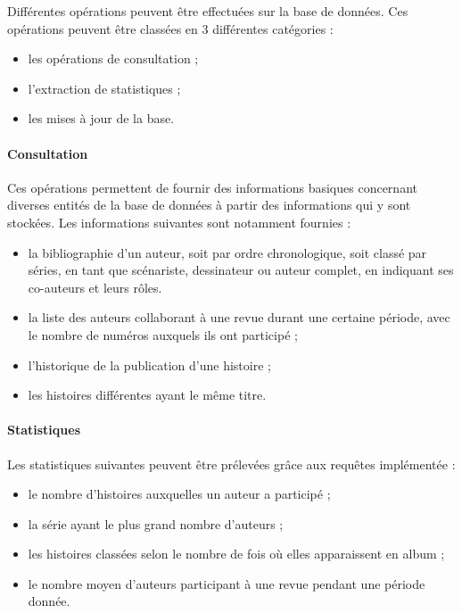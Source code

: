 \documentclass[12pt]{article}
\begin{document}
Différentes opérations peuvent être effectuées sur la base de données.
Ces opérations peuvent être classées en 3 différentes catégories :
\begin{itemize}
	\item les opérations de consultation ;
	\item l'extraction de statistiques ;
	\item les mises à jour de la base.
\end{itemize}

\paragraph{Consultation}
Ces opérations permettent de fournir des informations basiques concernant
diverses entités de la base de données à partir des informations qui y sont
stockées.
Les informations suivantes sont notamment fournies :
\begin{itemize}
	\item la bibliographie d’un auteur, soit par ordre chronologique, soit classé par séries, en tant que
		scénariste, dessinateur ou auteur complet, en indiquant ses co-auteurs et leurs rôles.
	\item la liste des auteurs collaborant à une revue durant une certaine période, avec le nombre de
		numéros auxquels ils ont participé ;
	\item l'historique de la publication d’une histoire ;
	\item les histoires différentes ayant le même titre.
\end{itemize}

\paragraph{Statistiques}
Les statistiques suivantes peuvent être prélevées grâce aux requêtes
implémentée :
\begin{itemize}
	\item le nombre d’histoires auxquelles un auteur a participé ;
	\item la série ayant le plus grand nombre d’auteurs ;
	\item les histoires classées selon le nombre de fois où elles apparaissent en album ;
	\item le nombre moyen d’auteurs participant à une revue pendant une période donnée.
\end{itemize}
\end{document}
